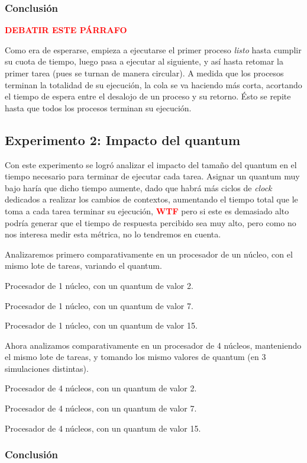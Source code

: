 \documentclass[a4paper]{article}
\begin{document}
\subsubsection{Conclusión}

\textcolor{red}{\textbf{DEBATIR ESTE PÁRRAFO}}

Como era de esperarse, empieza a ejecutarse el primer proceso \textit{listo}
hasta cumplir su cuota de tiempo, luego pasa a ejecutar al siguiente, y así
hasta retomar la primer tarea (pues se turnan de manera circular). A medida
que los procesos terminan la totalidad de su ejecución, la cola se va
haciendo más corta, acortando el tiempo de espera entre el desalojo de un
proceso y su retorno. Ésto se repite hasta que todos los procesos terminan
su ejecución.

\subsection{Experimento 2: Impacto del quantum}
Con este experimento se logró analizar el impacto del tamaño del quantum en
el tiempo necesario para terminar de ejecutar cada tarea. Asignar un quantum
muy bajo haría que dicho tiempo aumente, dado que habrá más ciclos de
\textit{clock} dedicados a realizar los cambios de contextos, aumentando el
tiempo total que le toma a cada tarea terminar su ejecución,
\textcolor{red}{\textbf{WTF}} pero si este es demasiado alto podría generar
que el tiempo de respuesta percibido sea muy alto, pero como no nos interesa
medir esta métrica, no lo tendremos en cuenta.

Analizaremos primero comparativamente en un procesador de un núcleo, con el
mismo lote de tareas, variando el quantum.

Procesador de 1 núcleo, con un quantum de valor 2.

Procesador de 1 núcleo, con un quantum de valor 7.

Procesador de 1 núcleo, con un quantum de valor 15.

Ahora analizamos comparativamente en un procesador de 4 núcleos, manteniendo
el mismo lote de tareas, y tomando los mismo valores de quantum (en 3
simulaciones distintas).

Procesador de 4 núcleos, con un quantum de valor 2.

Procesador de 4 núcleos, con un quantum de valor 7.

Procesador de 4 núcleos, con un quantum de valor 15.

\subsubsection{Conclusión}
\end{document}
